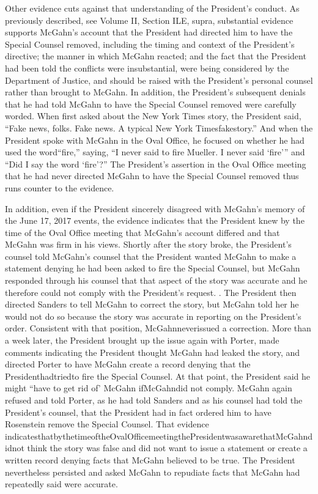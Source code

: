 Other evidence cuts against that understanding of the President's conduct.
As previously described, see Volume II, Section ILE, supra, substantial evidence supports McGahn's account that the President had directed him to have the Special Counsel removed, including the timing and context of the President's directive; the manner in which McGahn reacted; and the fact that the President had been told the conflicts were insubstantial, were being considered by the Department of Justice, and should be raised with the President's personal counsel rather than brought to McGahn.
In addition, the President's subsequent denials that he had told McGahn to have the Special Counsel removed were carefully worded.
When first asked about the New York Times story, the President said, “Fake news, folks. Fake news. A typical New York Timesfakestory.” And when the President spoke with McGahn in the Oval Office, he focused on whether he had used the word“fire,” saying, “I never said to fire Mueller.
I never said ‘fire'” and “Did I say the word ‘fire'?” The President's assertion in the Oval Office meeting that he had never directed McGahn to have the Special Counsel removed thus runs counter to the evidence.

In addition, even if the President sincerely disagreed with McGahn's memory of the June 17, 2017 events, the evidence indicates that the President knew by the time of the Oval Office
meeting that McGahn's account differed and that McGahn was firm in his views.
Shortly after the story broke, the President's counsel told McGahn's counsel that the President wanted McGahn to make a statement denying he had been asked to fire the Special Counsel, but McGahn responded through his counsel that that aspect of the story was accurate and he therefore could not comply with the President's request. .
The President then directed Sanders to tell McGahn to correct the story, but McGahn told her he would not do so because the story was accurate in reporting on the President's order.
Consistent with that position, McGahnneverissued a correction.
More than a week later, the President brought up the issue again with Porter, made comments indicating the President thought McGahn had leaked the story, and directed Porter to have McGahn create a record denying that the Presidenthadtriedto fire the Special Counsel.
At that point, the President said he might “have to get rid of' McGahn ifMcGahndid not comply.
McGahn again refused and told Porter, as he had told Sanders and as his counsel had told the President's counsel, that the President had in fact ordered him to have Rosenstein remove the Special Counsel.
That evidence indicatesthatbythetimeoftheOvalOfficemeetingthePresidentwasawarethatMcGahndidnot think the story was false and did not want to issue a statement or create a written record denying facts that McGahn believed to be true.
The President nevertheless persisted and asked McGahn to repudiate facts that McGahn had repeatedly said were accurate.

